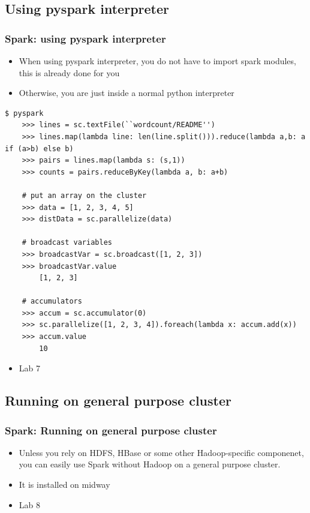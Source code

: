 \documentclass{beamer}
\begin{document}
\subsection{Using pyspark interpreter}
\begin{frame}[fragile]
  \frametitle{Spark: using pyspark interpreter}

\begin{itemize}
  \item When using pyspark interpreter, you do not have to import spark modules, this is already done for you
  \item Otherwise, you are just inside a normal python interpreter
\end{itemize}
{\color{mycolorcli}
  \begin{lstlisting}[frame=single,basicstyle=\tiny]
    $ pyspark
    >>> lines = sc.textFile(``wordcount/README'')
    >>> lines.map(lambda line: len(line.split())).reduce(lambda a,b: a if (a>b) else b)
    >>> pairs = lines.map(lambda s: (s,1))
    >>> counts = pairs.reduceByKey(lambda a, b: a+b)

    # put an array on the cluster
    >>> data = [1, 2, 3, 4, 5]
    >>> distData = sc.parallelize(data)

    # broadcast variables
    >>> broadcastVar = sc.broadcast([1, 2, 3])
    >>> broadcastVar.value
        [1, 2, 3]

    # accumulators
    >>> accum = sc.accumulator(0)
    >>> sc.parallelize([1, 2, 3, 4]).foreach(lambda x: accum.add(x))
    >>> accum.value
        10
  \end{lstlisting}
}
\begin{itemize}
\item Lab 7
\end{itemize}
\end{frame}

\subsection{Running on general purpose cluster}
\begin{frame}[fragile]
\frametitle{Spark: Running on general purpose cluster}

\begin{itemize}
  \item Unless you rely on HDFS, HBase or some other Hadoop-specific componenet, you can easily use Spark without Hadoop on a general purpose cluster.
  \item It is installed on midway
  \item Lab 8
\end{itemize}

\end{frame}
\end{document}
